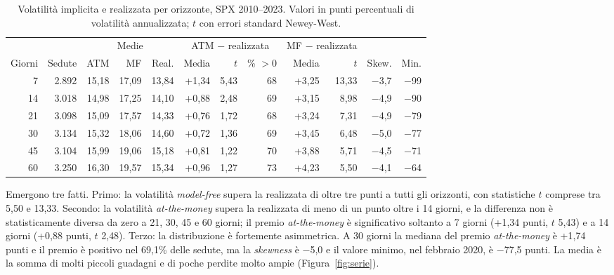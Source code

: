 \documentclass[11pt,a4paper]{article}
\begin{document}
\begin{table}[ht]\centering\small
\caption{Volatilità implicita e realizzata per orizzonte, SPX 2010--2023. Valori in punti percentuali di volatilità annualizzata; $t$ con errori standard Newey-West.}\label{tab:oriz}
\begin{tabular}{rrrrrrrrrrrr}\toprule
 & & \multicolumn{3}{c}{Medie} & \multicolumn{3}{c}{ATM $-$ realizzata} & \multicolumn{2}{c}{MF $-$ realizzata} & & \\ \cmidrule(lr){3-5}\cmidrule(lr){6-8}\cmidrule(lr){9-10}
Giorni & Sedute & ATM & MF & Real. & Media & $t$ & \% $>0$ & Media & $t$ & Skew. & Min. \\ \midrule
7 & 2.892 & 15{,}18 & 17{,}09 & 13{,}84 & +1{,}34 & 5{,}43 & 68 & +3{,}25 & 13{,}33 & $-$3{,}7 & $-$99 \\
14 & 3.018 & 14{,}98 & 17{,}25 & 14{,}10 & +0{,}88 & 2{,}48 & 69 & +3{,}15 & 8{,}98 & $-$4{,}9 & $-$90 \\
21 & 3.098 & 15{,}09 & 17{,}57 & 14{,}33 & +0{,}76 & 1{,}72 & 68 & +3{,}24 & 7{,}31 & $-$4{,}9 & $-$79 \\
30 & 3.134 & 15{,}32 & 18{,}06 & 14{,}60 & +0{,}72 & 1{,}36 & 69 & +3{,}45 & 6{,}48 & $-$5{,}0 & $-$77 \\
45 & 3.104 & 15{,}99 & 19{,}06 & 15{,}18 & +0{,}81 & 1{,}22 & 70 & +3{,}88 & 5{,}71 & $-$4{,}5 & $-$71 \\
60 & 3.250 & 16{,}30 & 19{,}57 & 15{,}34 & +0{,}96 & 1{,}27 & 73 & +4{,}23 & 5{,}50 & $-$4{,}1 & $-$64 \\
\bottomrule\end{tabular}\end{table}

Emergono tre fatti. Primo: la volatilità \emph{model-free} supera la realizzata di oltre tre punti a tutti gli orizzonti, con statistiche $t$ comprese tra 5{,}50 e 13{,}33. Secondo: la volatilità \emph{at-the-money} supera la realizzata di meno di un punto oltre i 14 giorni, e la differenza non è statisticamente diversa da zero a 21, 30, 45 e 60 giorni; il premio \emph{at-the-money} è significativo soltanto a 7 giorni (+1{,}34 punti, $t$ 5{,}43) e a 14 giorni (+0{,}88 punti, $t$ 2{,}48). Terzo: la distribuzione è fortemente asimmetrica. A 30 giorni la mediana del premio \emph{at-the-money} è +1{,}74 punti e il premio è positivo nel 69{,}1\% delle sedute, ma la \emph{skewness} è $-$5{,}0 e il valore minimo, nel febbraio 2020, è $-$77{,}5 punti. La media è la somma di molti piccoli guadagni e di poche perdite molto ampie (Figura~\ref{fig:serie}).
\end{document}
